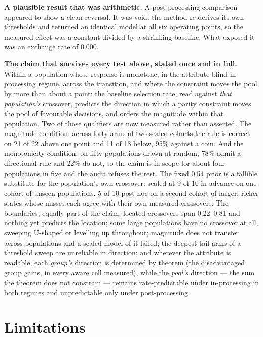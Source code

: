 \documentclass[9pt,conference]{IEEEtran}
\begin{document}
\textbf{A plausible result that was arithmetic.} A post-processing comparison appeared to show a
clean reversal. It was void: the method re-derives its own thresholds and returned an identical
model at all six operating points, so the measured effect was a constant divided by a shrinking
baseline. What exposed it was an exchange rate of 0.000.

\textbf{The claim that survives every test above, stated once and in full.} Within a
population whose response is monotone, in the attribute-blind in-processing regime, across
the transition, and where the constraint moves the pool by more than about a point: the
baseline selection rate, read against \emph{that population's} crossover, predicts the
direction in which a parity constraint moves the pool of favourable decisions, and orders the
magnitude within that population. Two of those qualifiers are now measured rather than
asserted. The magnitude condition: across forty arms of two sealed cohorts the rule is
correct on 21 of 22 above one point and 11 of 18 below, 95\% against a coin. And the
monotonicity condition: on fifty populations drawn at random, 78\% admit a directional rule
and 22\% do not, so the claim is in scope for about four populations in five and the audit
refuses the rest. The fixed 0.54 prior is a fallible
substitute for the population's own crossover: sealed at 9 of 10 in advance on one cohort of
unseen populations, 5 of 10 post-hoc on a second cohort of larger, richer states whose
misses each agree with their own measured crossovers. The boundaries, equally part of the
claim: located crossovers span 0.22--0.81 and nothing yet predicts the location; some large
populations have no crossover at all, sweeping U-shaped or levelling up throughout;
magnitude does not transfer across populations and a sealed model of it failed; the
deepest-tail arms of a threshold sweep are unreliable in direction; and wherever the
attribute is readable, each \emph{group's} direction is determined by theorem (the
disadvantaged group gains, in every aware cell measured), while the \emph{pool's}
direction --- the sum the theorem does not constrain --- remains rate-predictable under
in-processing in both regimes and unpredictable only under post-processing.

\section{Limitations}
\end{document}
